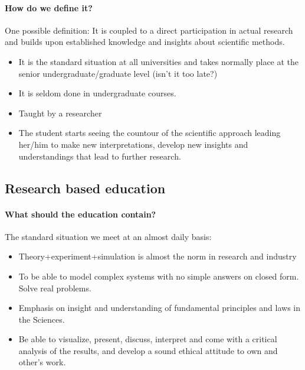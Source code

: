 \documentclass[%
twoside,                 %
final,                   %
10pt]{article}
\begin{document}
\paragraph{How do we define it?}
One possible definition: It is coupled to a direct participation in actual research and builds upon established
knowledge and insights about scientific methods.


\begin{itemize}
\item It is the standard situation at all universities  and takes normally place at the senior undergraduate/graduate level (isn't it too late?)

\item It is seldom done in undergraduate courses.

\item Taught by a researcher

\item The student starts seeing the countour of the scientific approach leading her/him to make new interpretations, develop new insights and understandings that lead  to further research.
\end{itemize}

\noindent





\subsection{Research based education}

\paragraph{What should the education contain?}
The standard situation we meet at an almost daily basis:

\begin{itemize}
\item Theory+experiment+simulation is almost the norm in research and industry

\item To be able to model complex systems with no simple answers on closed form. Solve real problems.

\item Emphasis on insight and understanding of fundamental principles and laws in the Sciences.

\item Be able to visualize, present, discuss, interpret and come with a critical analysis of the results, and develop a sound ethical attitude to own and other's work.
\end{itemize}
\end{document}
